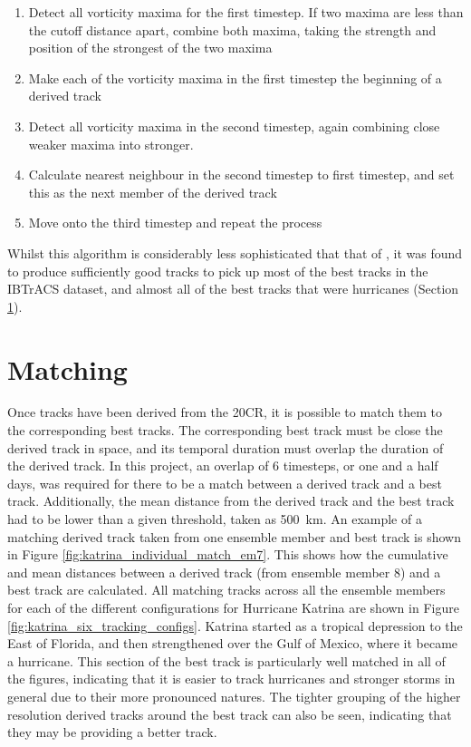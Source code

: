 \documentclass[pdftex,12pt,a4paper]{report}
\begin{document}
\begin{enumerate}
    \item Detect all vorticity maxima for the first timestep. If two maxima are less than the cutoff
        distance apart, combine both maxima, taking the strength and position of the strongest of
        the two maxima
    \item Make each of the vorticity maxima in the first timestep the beginning of a derived track
    \item Detect all vorticity maxima in the second timestep, again combining close weaker maxima
        into stronger. 
    \item Calculate nearest neighbour in the second timestep to first timestep, and set this as the
        next member of the derived track
    \item Move onto the third timestep and repeat the process
\end{enumerate}

Whilst this algorithm is considerably less sophisticated that that of \textcite{hodges1994general},
it was found to produce sufficiently good tracks to pick up most of the best tracks in the IBTrACS
dataset, and almost all of the best tracks that were hurricanes (Section
\ref{sec:matching}). 


\section{Matching}
\label{sec:matching}

Once tracks have been derived from the 20CR, it is possible to match them to the corresponding best
tracks. The corresponding best track must be close the derived track in space, and its temporal
duration must overlap the duration of the derived track. In this project, an overlap of 6 timesteps,
or one and a half days, was required for there to be a match between a derived track and a best
track. Additionally, the mean distance from the derived track and the best track had to be lower
than a given threshold, taken as \SI{500}{km}. An example of a matching derived track taken from
one ensemble member and best track is shown in Figure \ref{fig:katrina_individual_match_em7}.
This shows how the cumulative and mean distances between a derived track (from ensemble member 8)
and a best track are calculated. All matching tracks across all the ensemble members for each of the
different configurations for Hurricane Katrina are shown in Figure
\ref{fig:katrina_six_tracking_configs}. Katrina started as a tropical depression to the East of
Florida, and then strengthened over the Gulf of Mexico, where it became a hurricane. This section of
the best track is particularly well matched in all of the figures, indicating that it is easier to
track hurricanes and stronger storms in general due to their more pronounced natures. The tighter
grouping of the higher resolution derived tracks around the best track can also be seen, indicating
that they may be providing a better track. 
\end{document}
